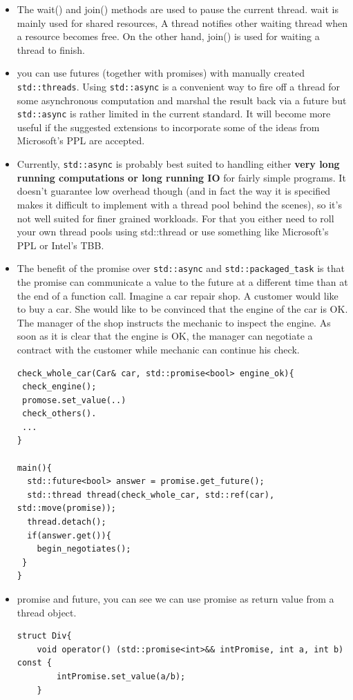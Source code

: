 \documentclass[a4paper,11pt,twoside]{book}
\begin{document}
\begin{itemize}
    \item The wait() and join() methods are used to pause the current thread. wait is mainly used for shared resources, A thread notifies other waiting thread when a resource becomes free. On the other hand, join() is used for waiting a thread to finish.

    \item you can use futures (together with promises) with manually created \texttt{std::threads}. Using \texttt{std::async} is a convenient way to fire off a thread for some asynchronous computation and marshal the result back via a future but \texttt{std::async} is rather limited in the current standard. It will become more useful if the suggested extensions to incorporate some of the ideas from Microsoft's PPL are accepted.

    \item Currently, \texttt{std::async} is probably best suited to handling either \textbf{very long running computations or long running IO} for fairly simple programs. It doesn't guarantee low overhead though (and in fact the way it is specified makes it difficult to implement with a thread pool behind the scenes), so it's not well suited for finer grained workloads. For that you either need to roll your own thread pools using std::thread or use something like Microsoft's PPL or Intel's TBB. 

    \item The benefit of the promise over \texttt{std::async} and \texttt{std::packaged\_task} is that the promise can communicate a value to the future at a different time than at the end of a function call. Imagine a car repair shop. A customer would like to buy a car. She would like to be convinced that the engine of the car is OK. The manager of the shop instructs the mechanic to inspect the engine. As soon as it is clear that the engine is OK, the manager can negotiate a contract with the customer while mechanic can continue his check. 
\begin{lstlisting}[]
check_whole_car(Car& car, std::promise<bool> engine_ok){
 check_engine();
 promose.set_value(..)
 check_others().
 ...
}

main(){
  std::future<bool> answer = promise.get_future();
  std::thread thread(check_whole_car, std::ref(car), std::move(promise));
  thread.detach();
  if(answer.get()){
    begin_negotiates();
 }
}
\end{lstlisting}

	\item promise and future, you can see we can use promise as return value from a thread object.
\begin{lstlisting}[numbers=none]
struct Div{	
	void operator() (std::promise<int>&& intPromise, int a, int b) const {
		intPromise.set_value(a/b);
	}
	

\end{lstlisting}
\end{itemize}
\end{document}
